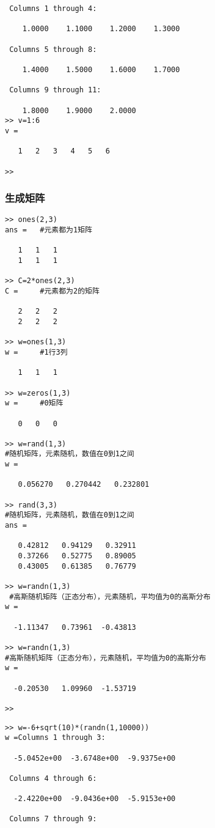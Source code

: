 \documentclass{article}
\begin{document}
\begin{CJK}{UTF8}{gbsn}
\begin{verbatim}
 Columns 1 through 4:

    1.0000    1.1000    1.2000    1.3000

 Columns 5 through 8:

    1.4000    1.5000    1.6000    1.7000

 Columns 9 through 11:

    1.8000    1.9000    2.0000
>> v=1:6
v =

   1   2   3   4   5   6

>>
\end{verbatim}
\subsubsection{生成矩阵}
\begin{verbatim}
>> ones(2,3)
ans =   #元素都为1矩阵

   1   1   1
   1   1   1

>> C=2*ones(2,3)
C =     #元素都为2的矩阵

   2   2   2
   2   2   2

>> w=ones(1,3)
w =     #1行3列

   1   1   1

>> w=zeros(1,3)
w =     #0矩阵

   0   0   0

>> w=rand(1,3)
#随机矩阵，元素随机，数值在0到1之间
w =     

   0.056270   0.270442   0.232801

>> rand(3,3)
#随机矩阵，元素随机，数值在0到1之间
ans =    

   0.42812   0.94129   0.32911
   0.37266   0.52775   0.89005
   0.43005   0.61385   0.76779

>> w=randn(1,3)
 #高斯随机矩阵（正态分布），元素随机，平均值为0的高斯分布
w =     

  -1.11347   0.73961  -0.43813

>> w=randn(1,3)
#高斯随机矩阵（正态分布），元素随机，平均值为0的高斯分布
w =

  -0.20530   1.09960  -1.53719

>>
\end{verbatim}
\begin{verbatim}
>> w=-6+sqrt(10)*(randn(1,10000))
w =Columns 1 through 3:

  -5.0452e+00  -3.6748e+00  -9.9375e+00

 Columns 4 through 6:

  -2.4220e+00  -9.0436e+00  -5.9153e+00

 Columns 7 through 9:


\end{verbatim}
\end{CJK}
\end{document}
